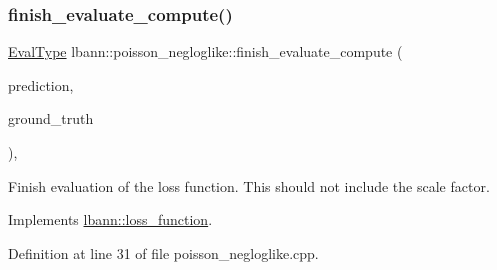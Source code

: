 \subsubsection{\texorpdfstring{finish\+\_\+evaluate\+\_\+compute()}{finish\_evaluate\_compute()}}
{\footnotesize\ttfamily \hyperlink{base_8hpp_a3266f5ac18504bbadea983c109566867}{Eval\+Type} lbann\+::poisson\+\_\+negloglike\+::finish\+\_\+evaluate\+\_\+compute (\begin{DoxyParamCaption}\item[{const \hyperlink{base_8hpp_a9a697a504ae84010e7439ffec862b470}{Abs\+Dist\+Mat} \&}]{prediction,  }\item[{const \hyperlink{base_8hpp_a9a697a504ae84010e7439ffec862b470}{Abs\+Dist\+Mat} \&}]{ground\+\_\+truth }\end{DoxyParamCaption})\hspace{0.3cm}{\ttfamily [override]}, {\ttfamily [virtual]}}

Finish evaluation of the loss function. This should not include the scale factor. 

Implements \hyperlink{classlbann_1_1loss__function_a3ea8553a4e9c75477d7d4fc533c4d4fd}{lbann\+::loss\+\_\+function}.



Definition at line 31 of file poisson\+\_\+negloglike.\+cpp.


